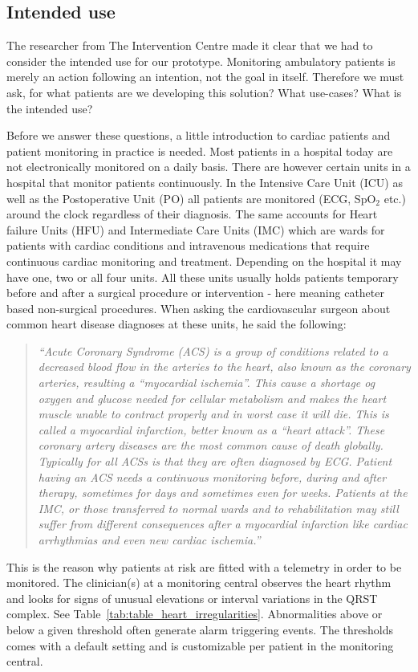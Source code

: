 \subsection{Intended use} %
\label{sub:intended_use}

The researcher from The Intervention Centre made it clear that we had to consider the intended use for our prototype. Monitoring ambulatory patients is merely an action following an intention, not the goal in itself. Therefore we must ask, for what patients are we developing this solution? What use-cases? What is the intended use?

Before we answer these questions, a little introduction to cardiac patients and patient monitoring in practice is needed. Most patients in a hospital today are not electronically monitored on a daily basis. There are however certain units in a hospital that monitor patients continuously. In the Intensive Care Unit (ICU) as well as the Postoperative Unit (PO) all patients are monitored (ECG, SpO$_2$ etc.) around the clock regardless of their diagnosis. The same accounts for Heart failure Units (HFU) and Intermediate Care Units (IMC) which are wards for patients with cardiac conditions and intravenous medications that require continuous cardiac monitoring and treatment. Depending on the hospital it may have one, two or all four units. All these units usually holds patients temporary before and after a surgical procedure or intervention - here meaning catheter based non-surgical procedures. When asking the cardiovascular surgeon about common heart disease diagnoses at these units, he said the following: 

\begin{quote} 
\textit{``Acute Coronary Syndrome (ACS) is a group of conditions related to a decreased blood flow in the arteries to the heart, also known as the coronary arteries, resulting a “myocardial ischemia”. This cause a shortage og oxygen and glucose needed for cellular metabolism and makes the heart muscle unable to contract properly and in worst case it will die. This is called a myocardial infarction, better known as a “heart attack”. These coronary artery diseases are the most common cause of death globally. Typically for all ACSs is that they are often diagnosed by ECG. Patient having an ACS needs a continuous monitoring before, during and after therapy, sometimes for days and sometimes even for weeks. Patients at the IMC, or those transferred to normal wards and to  rehabilitation may still suffer from different consequences after a myocardial infarction like cardiac arrhythmias and even new cardiac ischemia.''}
\end{quote}
\noindent
This is the reason why patients at risk are fitted with a telemetry in order to be monitored. The clinician(s) at a monitoring central observes the heart rhythm and looks for signs of unusual elevations or interval variations in the QRST complex. See Table~\ref{tab:table_heart_irregularities}. Abnormalities above or below a given threshold often generate alarm triggering events. The thresholds comes with a default setting and is customizable per patient in the monitoring central. 

